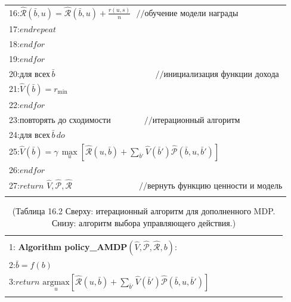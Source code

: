 \documentclass[10pt,a4paper]{article}
\begin{document}
\begin{table}[H]
\begin{center}
\begin{tabular}{|l|}
16:\hspace{19mm}$\hat{\mathcal{R}}(\bar{b},u)=\hat{\mathcal{R}}(\bar{b},u)+\frac{r(u,s)}{n}\,\,\,\,//\text{обучение модели награды}$\\
17:\hspace{15mm}$\textit{endrepeat}$\\
18:\hspace{10mm}$\textit{endfor}$\\
19:\hspace{5mm}$\textit{endfor}$\\
20:\hspace{5mm}$\textit{для всех}\,\bar{b}\qquad\qquad\qquad\qquad\qquad\qquad//\text{инициализация функции дохода}$\\
21:\hspace{10mm}$\hat{V}(\bar{b})=r_{\min}$\\
22:\hspace{5mm}$\textit{endfor}$\\
23:\hspace{5mm}$\textit{повторять до сходимости}\qquad\qquad//\text{итерационный алгоритм}$\\
24:\hspace{10mm}$\textit{для всех}\,\bar{b}\,\textit{do}$\\
25:\hspace{15mm}$\hat{V}(\bar{b})=\gamma\,\underset{u}{\max}[\hat{\mathcal{R}}(u,\bar{b})+\sum_{\bar{b}'}\hat{V}(\bar{b}')\hat{\mathcal{P}}(\bar{b},u,\bar{b}')]$\\
26:\hspace{5mm}$\textit{endfor}$\\
27:\hspace{5mm}$\textit{return}\,\,\hat{V},\hat{\mathcal{P}},\hat{\mathcal{R}}\qquad\qquad\qquad\qquad//\text{вернуть функцию ценности и модель}$\\
{}\\
\hline
\end{tabular}
\end{center}
\end{table}

\begin{table}[H]
\begin{center}
\begin{tabular}{|l|}
\hline
{}\\
1:\textbf{ Algorithm policy\_AMDP}$(\hat{V},\hat{\mathcal{P}},\hat{\mathcal{R}},b):\qquad\qquad\qquad\qquad\qquad\qquad$\\
2:\hspace{5mm}$\bar{b}=f(b)$\\
3:\hspace{5mm}$\textit{return}\,\,\underset{u}{\text{argmax}}[\hat{\mathcal{R}}(u,\bar{b})+\sum_{\bar{b}'}\hat{V}(\bar{b}')\hat{\mathcal{P}}(\bar{b},u,\bar{b}')]$\\
{}\\
\hline
\end{tabular}
\caption{(Таблица 16.2 Сверху:  итерационный алгоритм для дополненного MDP. Снизу: алгоритм выбора управляющего действия.)}
\end{center}
\end{table}			
\end{document}
